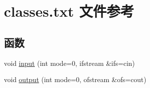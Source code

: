 \hypertarget{classes_8txt}{}\section{classes.\+txt 文件参考}
\label{classes_8txt}
\subsection*{函数}
\begin{DoxyCompactItemize}
\item 
void \hyperlink{classes_8txt_a60a60807972bd23903a353ba2a01e535}{input} (int mode=0, ifstream \&ifs=cin)
\item 
void \hyperlink{classes_8txt_ae812a710e2af1a588c6b246aca6e72dd}{output} (int mode=0, ofstream \&ofs=cout)
\end{DoxyCompactItemize}

